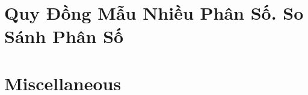 \documentclass{article}
\begin{document}

\section{Quy Đồng Mẫu Nhiều Phân Số. So Sánh Phân Số}


\section{Miscellaneous}


\printbibliography[heading=bibintoc]
	
\end{document}
